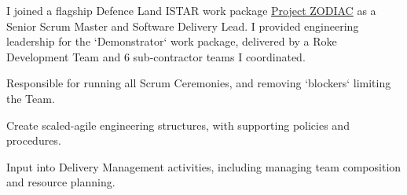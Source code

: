 I joined a flagship Defence Land ISTAR work package \href{https://www.roke.co.uk/news/digitising-land-tactical-istar}{Project ZODIAC} as a Senior Scrum Master and Software Delivery Lead. I provided engineering leadership for the `Demonstrator` work package, delivered by a Roke Development Team and 6 sub-contractor teams I coordinated.
\vspace{0.25em}
\begin{tightemize}
  \item Responsible for running all Scrum Ceremonies, and removing `blockers` limiting the Team.
  \item Create scaled-agile engineering structures, with supporting policies and procedures.
  \item Input into Delivery Management activities, including managing team composition and resource planning.
\end{tightemize}
\sectionsep{}

